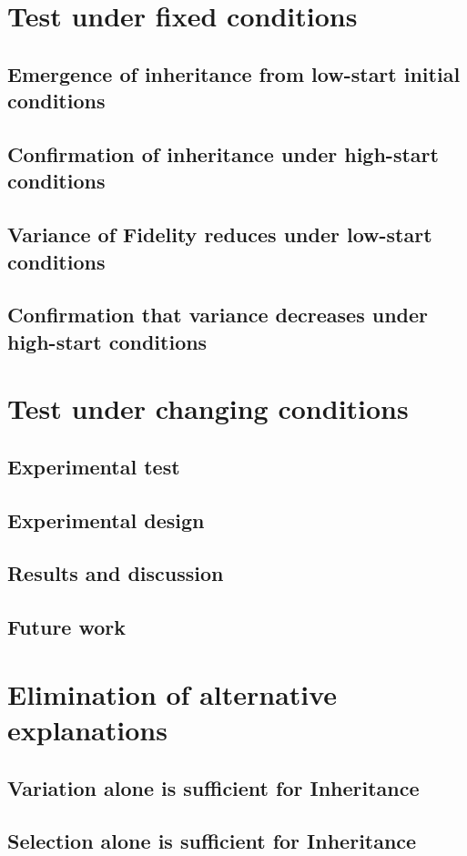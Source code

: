 \documentclass[]{report}
\begin{document}
\chapter{Test under fixed conditions}
\section{Emergence of inheritance from low-start initial conditions}
\section{Confirmation of inheritance under high-start conditions}
\section{Variance of Fidelity reduces under low-start conditions}
\section{Confirmation that variance decreases under high-start conditions}

\chapter{Test under changing conditions}
\section{Experimental test}
\section{Experimental design}
\section{Results and discussion}
\section{Future work}

\chapter{Elimination of alternative explanations}
\section{Variation alone is sufficient for Inheritance}
\section{Selection alone is sufficient for Inheritance}
\end{document}
